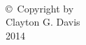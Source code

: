 
\thispagestyle{empty}
\hbox{\ }

\vfill
\renewcommand{\baselinestretch}{1}
\small\normalsize

\vspace{-.65in}

\begin{center}
\large{\copyright \hbox{ }Copyright by\\
Clayton G. Davis  %
\\
2014}
\end{center}

\vfill

